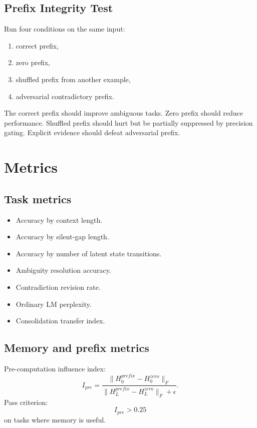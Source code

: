 \documentclass[11pt]{article}
\begin{document}
\subsection{Prefix Integrity Test}

Run four conditions on the same input:
\begin{enumerate}
    \item correct prefix,
    \item zero prefix,
    \item shuffled prefix from another example,
    \item adversarial contradictory prefix.
\end{enumerate}
The correct prefix should improve ambiguous tasks. Zero prefix should reduce performance. Shuffled prefix should hurt but be partially suppressed by precision gating. Explicit evidence should defeat adversarial prefix.

\section{Metrics}

\subsection{Task metrics}

\begin{itemize}
    \item Accuracy by context length.
    \item Accuracy by silent-gap length.
    \item Accuracy by number of latent state transitions.
    \item Ambiguity resolution accuracy.
    \item Contradiction revision rate.
    \item Ordinary LM perplexity.
    \item Consolidation transfer index.
\end{itemize}

\subsection{Memory and prefix metrics}

Pre-computation influence index:
\begin{equation}
    I_{pre}=\frac{\|H_0^{prefix}-H_0^{zero}\|_F}{\|H_L^{prefix}-H_L^{zero}\|_F+\epsilon}.
\end{equation}
Pass criterion:
\begin{equation}
    I_{pre}>0.25
\end{equation}
on tasks where memory is useful.
\end{document}
